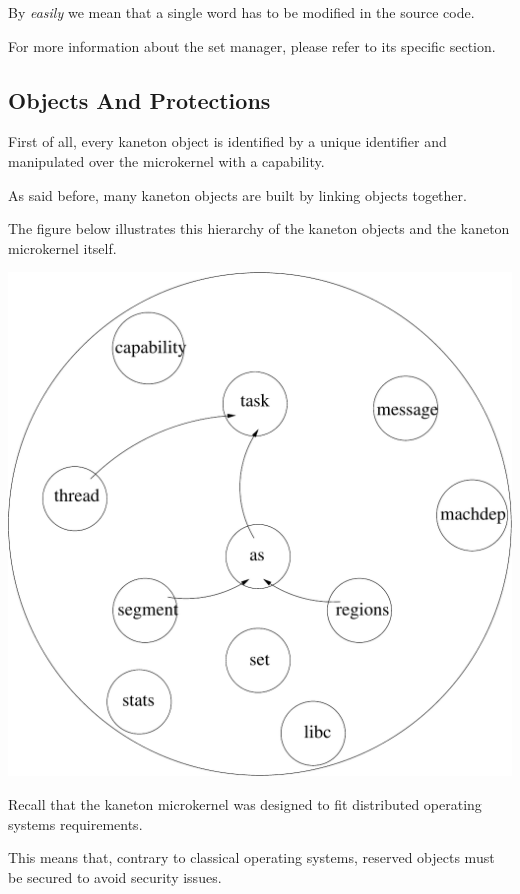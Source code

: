 \begin{multicols}{2}
By \textit{easily} we mean that a single word has to be modified in the
source code.

For more information about the set manager, please refer to its
specific section.

%
%

\subsection{Objects And Protections}

First of all, every kaneton object is identified by a unique identifier
and manipulated over the microkernel with a capability.

As said before, many kaneton objects are built by linking objects
together.

The figure below illustrates this hierarchy of the kaneton objects
and the kaneton microkernel itself.

\begin{center}
  \includegraphics[scale=0.35]{figures/kaneton.pdf}
\end{center}

Recall that the kaneton microkernel was designed to fit distributed
operating systems requirements.

This means that, contrary to classical operating systems, reserved
objects must be secured to avoid security issues.


\end{multicols}
